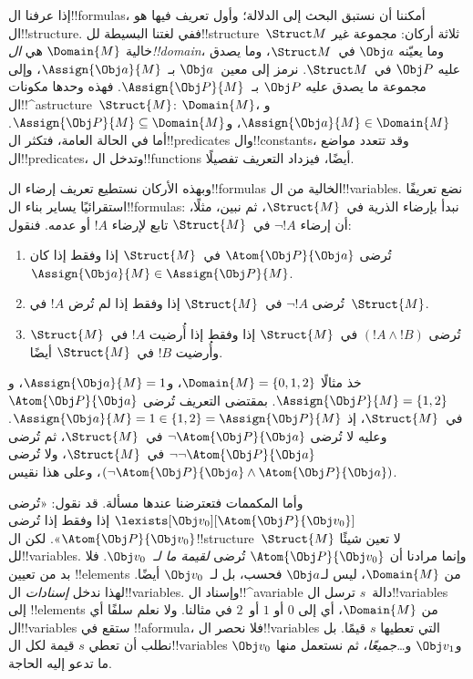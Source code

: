 \documentclass[../../../include/open-logic-section]{subfiles}
\begin{document}


إذا عرفنا ال!!{formula}s، أمكننا أن نستبق البحث إلى الدلالة؛ وأول
تعريف فيها هو ال!!{structure}. ففي لغتنا البسيطة لل!!{structure}~$\Struct M$
ثلاثة أركان: مجموعة غير خالية $\Domain{M}$ هي
\emph{ال!!{domain}}، وما يعيّنه $\Obj a$ في~$\Struct M$، وما
يصدق عليه $\Obj P$ في~$\Struct M$. نرمز إلى معين~$\Obj a$
بـ~$\Assign{\Obj a}{M}$، وإلى مجموعة ما يصدق عليه $\Obj P$
بـ~$\Assign{\Obj P}{M}$. فهذه وحدها مكونات
ال!!^a{structure}~$\Struct{M}$: $\Domain{M}$،
و$\Assign{\Obj a}{M} \in \Domain{M}$،
و$\Assign{\Obj P}{M} \subseteq \Domain{M}$. أما في الحالة العامة،
فتكثر ال!!{predicate}s وال!!{constant}s، وقد تتعدد مواضع
ال!!{predicate}s، وتدخل ال!!{function}s أيضًا، فيزداد التعريف
تفصيلًا.

وبهذه الأركان نستطيع تعريف إرضاء ال!!{formula}s الخالية من
ال!!{variable}s. نضع تعريفًا استقرائيًا يساير بناء ال!!{formula}s:
نبدأ بإرضاء الذرية في~$\Struct{M}$، ثم نبين، مثلًا، أن إرضاء
$\lnot !A$ في~$\Struct{M}$ تابع لإرضاء $!A$ أو عدمه. فنقول:

\begin{enumerate}
  \item تُرضى $\Atom{\Obj P}{\Obj a}$ في~$\Struct{M}$ إذا وفقط إذا
  كان $\Assign{\Obj a}{M} \in \Assign{\Obj P}{M}$.
  \item تُرضى $\lnot !A$ في~$\Struct{M}$ إذا وفقط إذا لم تُرض
  $!A$ في~$\Struct{M}$.
  \item تُرضى $(!A \land !B)$ في~$\Struct{M}$ إذا وفقط إذا أُرضيت
  $!A$ في~$\Struct{M}$ وأُرضيت $!B$ في~$\Struct{M}$ أيضًا.
\end{enumerate}
خذ مثالًا $\Domain{M} = \{0, 1, 2\}$،
و$\Assign{\Obj a}{M} = 1$،
و$\Assign{\Obj P}{M} = \{1, 2\}$. بمقتضى التعريف تُرضى
$\Atom{\Obj P}{\Obj a}$ في~$\Struct{M}$، إذ
$\Assign{\Obj a}{M} =  1 \in \{1,2\} = \Assign{\Obj P}{M}$.
وعليه لا تُرضى $\lnot \Atom{\Obj P}{\Obj a}$ في~$\Struct{M}$،
ثم تُرضى $\lnot\lnot \Atom{\Obj P}{\Obj a}$ في~$\Struct{M}$،
ولا تُرضى
$(\lnot \Atom{\Obj P}{\Obj a} \land \Atom{\Obj P}{\Obj a})$،
وعلى هذا نقيس.

وأما المكممات فتعترضنا عندها مسألة. قد نقول:
«تُرضى $\lexists[\Obj v_0][\Atom{\Obj P}{\Obj v_0}]$ إذا وفقط
إذا تُرضى $\Atom{\Obj P}{\Obj v_0}$». لكن
ال!!{structure}~$\Struct{M}$ لا تعين شيئًا لل!!{variable}s.
وإنما مرادنا أن $\Atom{\Obj P}{\Obj v_0}$ تُرضى
\emph{لقيمة ما لـ~$\Obj v_0$}. فلا بد من تعيين
!!{element}s من $\Domain{M}$، ليس لـ$\Obj a$ فحسب، بل
لـ~$\Obj v_0$ أيضًا. لهذا ندخل \emph{إسنادات} ال!!{variable}s.
وإسناد ال!!^a{variable} دالة~$s$ ترسل ال!!{variable}s إلى
!!{element}s من $\Domain{M}$، أي إلى $0$ أو $1$ أو~$2$ في
مثالنا. ولا نعلم سلفًا أي ال!!{variable}s ستقع في
!!a{formula}، فلا نحصر ال!!{variable}s التي تعطيها $s$ قيمًا.
بل نطلب أن تعطي $s$ قيمة لكل ال!!{variable}s
$\Obj v_0$ و$\Obj v_1$ و\dots\@ \emph{جميعًا}، ثم نستعمل
منها ما تدعو إليه الحاجة.
\end{document}

